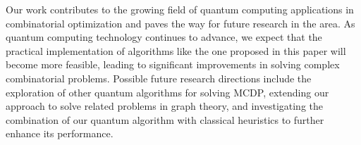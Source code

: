 Our work contributes to the growing field of quantum computing applications in combinatorial optimization and paves the way for future research in the area. As quantum computing technology continues to advance, we expect that the practical implementation of algorithms like the one proposed in this paper will become more feasible, leading to significant improvements in solving complex combinatorial problems. Possible future research directions include the exploration of other quantum algorithms for solving MCDP, extending our approach to solve related problems in graph theory, and investigating the combination of our quantum algorithm with classical heuristics to further enhance its performance.

